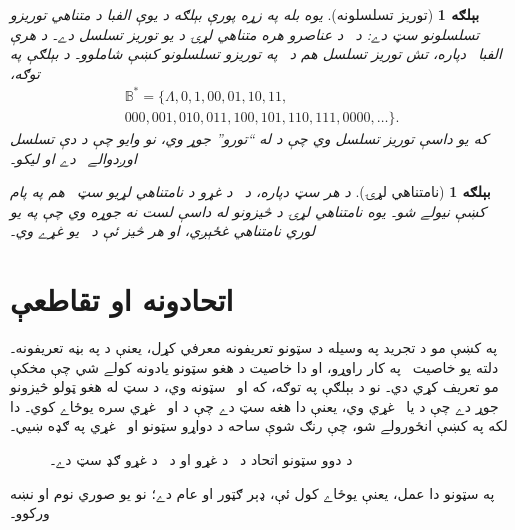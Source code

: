 \documentclass[12pt,a4paper,oneside]{report}
\newcommand{\Setabs}[2]{\{#1 : #2\}}
\newcommand{\Bin}{\mathbb{B}}
\newcommand{\len}[1]{\mathrm{len}(#1)}
\newcommand{\olfileid}[3]{\gdef\pspart{#1}\gdef\pschapter{#2}\gdef\pssection{#3}}
\newcommand{\olsection}[1]{\section{#1}\label{\pspart:\pschapter:\pssection:sec}}
\newcommand{\ollabel}[1]{\label{\pspart:\pschapter:\pssection:#1}}
\newlength{\olphotowidth}
\newcommand{\olasset}[2][\olphotowidth]{\centering\begin{LTR}\centering\resizebox{#1}{!}{}\end{LTR}}
\newenvironment{explain}{}{}
\newenvironment{tagblock}[1]{}{}
\newtheorem{ex}[defn]{بېلګه}
\begin{document}
\begin{tagblock}{compsci}
\begin{ex}[توريز تسلسلونه]
يوه بله په زړه پورې بېلګه د يوې الفبا  د \emph{متناهي توريزو تسلسلونو} سټ  دے: د~ د عناصرو هره متناهي لړۍ د  يو توريز تسلسل دے۔ د هرې الفبا~ دپاره، \emph{تش توريز تسلسل \LR{$\Lambda$}} هم د~ په توريزو تسلسلونو کښې شاملوو۔ د بېلګې په توګه،
\begin{multline*}
\Bin^*
=\{\Lambda,0,1,00,01,10,11,\\
000,001,010,011,100,101,110,111,0000,\ldots\}.
\end{multline*}
که  يو داسې توريز تسلسل وي چې د  له  ``تورو'' جوړ وي، نو وايو چې د دې تسلسل \emph{اوږدوالے}~ دے او \LR{$\len{x}=n$} ليکو۔
\end{ex}
\end{tagblock}

\begin{ex}[نامتناهي لړۍ]
د هر سټ  دپاره، د~ د غړو د نامتناهي لړيو سټ~ هم په پام کښې نيولے شو۔ يوه نامتناهي لړۍ  د څيزونو له داسې لست نه جوړه وي چې په يو لوري نامتناهي غځېږي، او هر څيز ئې د~ يو غړے وي۔
\end{ex}




\olfileid{sfr}{set}{uni}
\olsection{اتحادونه او تقاطعې}

\begin{explain}
په  کښې مو د تجريد په وسيله د سټونو تعريفونه معرفي کړل، يعنې د \LR{$\Setabs{x}{\phi(x)}$} په بڼه تعريفونه۔ دلته يو خاصيت~\LR{$\phi$} په کار راوړو، او دا خاصيت د هغو سټونو يادونه کولے شي چې مخکې مو تعريف کړي دي۔ نو د بېلګې په توګه، که  او~ سټونه وي، د \LR{$\Setabs{x}{x \in A \lor x \in B}$} سټ له هغو ټولو څيزونو جوړ دے چې د  يا~ غړي وي، يعنې دا هغه سټ دے چې د  او~ غړي سره يوځاے کوي۔ دا لکه په  کښې انځورولے شو، چې رنګ شوې ساحه د دواړو سټونو  او~ غړي په ګډه ښيي۔

\begin{figure}
  \olasset{assets/diagrams/union.tikz}
  \caption{د دوو سټونو اتحاد  د~ د غړو او د~ د غړو ګډ سټ دے۔}
  \ollabel{fig:union}
\end{figure}

په سټونو دا عمل، يعنې يوځاے کول ئې، ډېر ګټور او عام دے؛ نو يو صوري نوم او نښه ورکوو۔
\end{explain}
\end{document}
